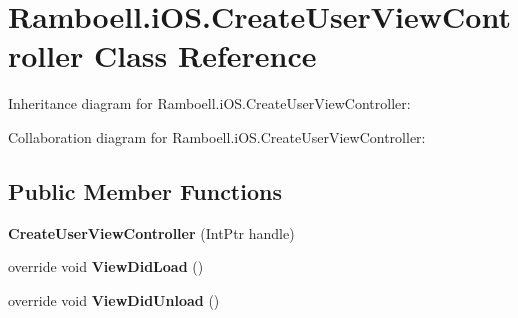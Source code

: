 \hypertarget{class_ramboell_1_1i_o_s_1_1_create_user_view_controller}{}\section{Ramboell.\+i\+O\+S.\+Create\+User\+View\+Controller Class Reference}
\label{class_ramboell_1_1i_o_s_1_1_create_user_view_controller}


Inheritance diagram for Ramboell.\+i\+O\+S.\+Create\+User\+View\+Controller\+:


Collaboration diagram for Ramboell.\+i\+O\+S.\+Create\+User\+View\+Controller\+:
\subsection*{Public Member Functions}
\begin{DoxyCompactItemize}
\item 
\mbox{\label{class_ramboell_1_1i_o_s_1_1_create_user_view_controller_af749aeedd4bb661f67ab5f297a7c3d49}} 
{\bfseries Create\+User\+View\+Controller} (Int\+Ptr handle)
\item 
\mbox{\label{class_ramboell_1_1i_o_s_1_1_create_user_view_controller_a53e036ac7b3cd09c24835ba80d52b199}} 
override void {\bfseries View\+Did\+Load} ()
\item 
\mbox{\label{class_ramboell_1_1i_o_s_1_1_create_user_view_controller_a8abfc8e89410516cc428d838f308effb}} 
override void {\bfseries View\+Did\+Unload} ()
\end{DoxyCompactItemize}
